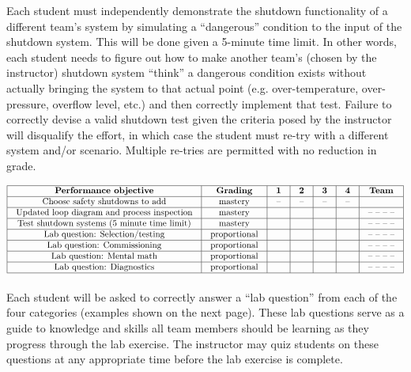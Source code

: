 \documentclass[12pt,a4paper]{book}
\begin{document}
Each student must independently demonstrate the shutdown functionality of a different team's system by simulating a ``dangerous'' condition to the input of the shutdown system.  This will be done given a 5-minute time limit.  In other words, each student needs to figure out how to make another team's (chosen by the instructor) shutdown system ``think'' a dangerous condition exists without actually bringing the system to that actual point (e.g. over-temperature, over-pressure, overflow level, etc.) and then correctly implement that test.  Failure to correctly devise a valid shutdown test given the criteria posed by the instructor will disqualify the effort, in which case the student must re-try with a different system and/or scenario.  Multiple re-tries are permitted with no reduction in grade.

\vskip 10pt



$$\vbox{\offinterlineskip
\halign{\strut
\vrule \quad\hfil # \ \hfil & 
\vrule \quad\hfil # \ \hfil & 
\vrule \quad\hfil # \ \hfil & 
\vrule \quad\hfil # \ \hfil & 
\vrule \quad\hfil # \ \hfil & 
\vrule \quad\hfil # \ \hfil & 
\vrule \quad\hfil # \ \hfil \vrule \cr
\noalign{\hrule}
%
{\bf Performance objective} & {\bf Grading} & {\bf 1} & {\bf 2} & {\bf 3} & {\bf 4} & {\bf Team} \cr
%
\noalign{\hrule}
%
Choose safety shutdowns to add & mastery & -- & -- & -- & -- & \cr
%
\noalign{\hrule}
%
Updated loop diagram and process inspection & mastery & & & & & -- -- -- -- \cr
%
\noalign{\hrule}
%
Test shutdown systems (5 minute time limit) & mastery & & & & & -- -- -- -- \cr
%
\noalign{\hrule}
%
Lab question: Selection/testing & proportional &  &  &  &  & -- -- -- -- \cr
%
\noalign{\hrule}
%
Lab question: Commissioning & proportional &  &  &  &  & -- -- -- -- \cr
%
\noalign{\hrule}
%
Lab question: Mental math & proportional &  &  &  &  & -- -- -- -- \cr
%
\noalign{\hrule}
%
Lab question: Diagnostics & proportional &  &  &  &  & -- -- -- -- \cr
%
\noalign{\hrule}
} %
}$$ %

Each student will be asked to correctly answer a ``lab question'' from each of the four categories (examples shown on the next page).  These lab questions serve as a guide to knowledge and skills all team members should be learning as they progress through the lab exercise.  The instructor may quiz students on these questions at any appropriate time before the lab exercise is complete.
\end{document}
